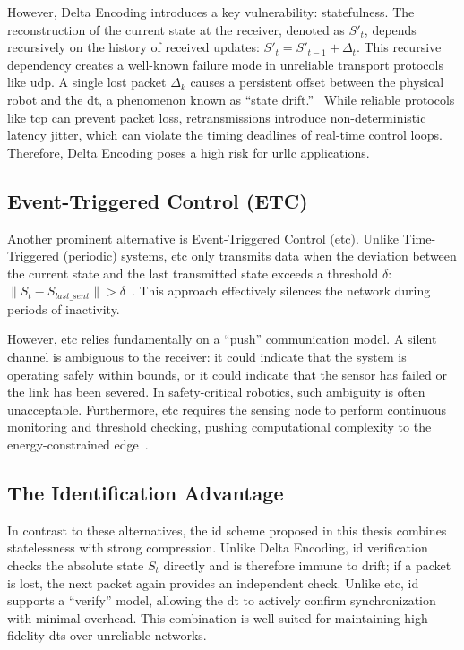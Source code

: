 However, Delta Encoding introduces a key vulnerability: statefulness. The reconstruction of the current state at the receiver, denoted as $S'_t$, depends recursively on the history of received updates: $S'_t = S'_{t-1} + \Delta_t$. This recursive dependency creates a well-known failure mode in unreliable transport protocols like \gls{udp}. A single lost packet $\Delta_k$ causes a persistent offset between the physical robot and the \gls{dt}, a phenomenon known as ``state drift.''~\cite{ishibashi2007lag} While reliable protocols like \gls{tcp} can prevent packet loss, retransmissions introduce non-deterministic latency jitter, which can violate the timing deadlines of real-time control loops. Therefore, Delta Encoding poses a high risk for \gls{urllc} applications.

\subsection{Event-Triggered Control (ETC)}
Another prominent alternative is Event-Triggered Control (\gls{etc}). Unlike Time-Triggered (periodic) systems, \gls{etc} only transmits data when the deviation between the current state and the last transmitted state exceeds a threshold $\delta$: $\|S_t - S_{last\_sent}\| > \delta$~\cite{tabuada2007event}. This approach effectively silences the network during periods of inactivity.

However, \gls{etc} relies fundamentally on a ``push'' communication model. A silent channel is ambiguous to the receiver: it could indicate that the system is operating safely within bounds, or it could indicate that the sensor has failed or the link has been severed. In safety-critical robotics, such ambiguity is often unacceptable. Furthermore, \gls{etc} requires the sensing node to perform continuous monitoring and threshold checking, pushing computational complexity to the energy-constrained edge~\cite{heemels2012introduction}.

\subsection{The Identification Advantage}
In contrast to these alternatives, the \gls{id} scheme proposed in this thesis combines statelessness with strong compression. Unlike Delta Encoding, \gls{id} verification checks the absolute state $S_t$ directly and is therefore immune to drift; if a packet is lost, the next packet again provides an independent check. Unlike \gls{etc}, \gls{id} supports a ``verify'' model, allowing the \gls{dt} to actively confirm synchronization with minimal overhead. This combination is well-suited for maintaining high-fidelity \glspl{dt} over unreliable networks.

